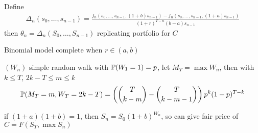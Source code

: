 \begin{prop}
    Define
    \begin{align*}
        \Delta_n(s_0, \dots, s_{n-1}) = \frac{f_n(s_0, \dots, s_{n-1}, (1 + b)s_{n-1}) - f_n(s_0, \dots, s_{n-1}, (1 + a)s_{n-1})}{(1+r)^{T-n}(b-a)s_{n-1}}
    \end{align*}
    then $\theta_n = \Delta_n(S_0, \dots, S_{n-1})$ replicating portfolio for $C$
\end{prop}

\begin{fact}
    Binomial model complete when $ r \in (a, b)$
\end{fact}

\begin{prop}
    $(W_n)$ simple random walk with $\mathbb{P}(W_1 = 1) = p$, let $M_T = \max W_n$, then with $k \leq T$, $2k - T \leq m \leq k$
    \begin{align*}
        \mathbb{P}(M_T = m, W_T = 2k - T) = \left( {T \choose k-m} - {T \choose k - m -1} \right)p^k(1-p)^{T-k}
    \end{align*}
\end{prop}

\begin{example}
    if $(1 + a)(1 + b) = 1$, then $S_n = S_0(1 + b)^{W_n}$, so can give fair price of $C = F(S_T, \max S_n)$
\end{example}

